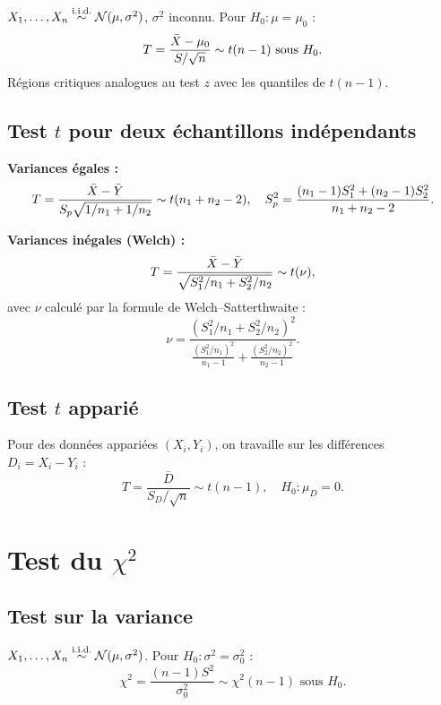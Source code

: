 \begin{theoreme}
$X_1,\ldots,X_n\overset{\text{i.i.d.}}{\sim}\mathcal{N}(\mu,\sigma^2)$, $\sigma^2$ inconnu. Pour $H_0:\mu=\mu_0$ :
\[
T = \frac{\bar{X}-\mu_0}{S/\sqrt{n}} \sim t(n-1) \text{ sous } H_0.
\]
R\'egions critiques analogues au test $z$ avec les quantiles de $t(n-1)$.
\end{theoreme}

\subsection{Test $t$ pour deux \'echantillons ind\'ependants}

\textbf{Variances \'egales :}
\[
T = \frac{\bar{X}-\bar{Y}}{S_p\sqrt{1/n_1+1/n_2}} \sim t(n_1+n_2-2), \quad S_p^2=\frac{(n_1-1)S_1^2+(n_2-1)S_2^2}{n_1+n_2-2}.
\]

\textbf{Variances in\'egales (Welch) :}
\[
T = \frac{\bar{X}-\bar{Y}}{\sqrt{S_1^2/n_1+S_2^2/n_2}} \sim t(\nu),
\]
avec $\nu$ calcul\'e par la formule de Welch--Satterthwaite :
\[
\nu = \frac{(S_1^2/n_1+S_2^2/n_2)^2}{\frac{(S_1^2/n_1)^2}{n_1-1}+\frac{(S_2^2/n_2)^2}{n_2-1}}.
\]

\subsection{Test $t$ appari\'e}

Pour des donn\'ees appari\'ees $(X_i,Y_i)$, on travaille sur les diff\'erences $D_i=X_i-Y_i$ :
\[
T = \frac{\bar{D}}{S_D/\sqrt{n}} \sim t(n-1), \quad H_0:\mu_D=0.
\]

\section{Test du $\chi^2$}
\label{sec:test-chi2}

\subsection{Test sur la variance}

\begin{theoreme}
$X_1,\ldots,X_n\overset{\text{i.i.d.}}{\sim}\mathcal{N}(\mu,\sigma^2)$. Pour $H_0:\sigma^2=\sigma_0^2$ :
\[
\chi^2 = \frac{(n-1)S^2}{\sigma_0^2} \sim \chi^2(n-1) \text{ sous } H_0.
\]
\end{theoreme}

